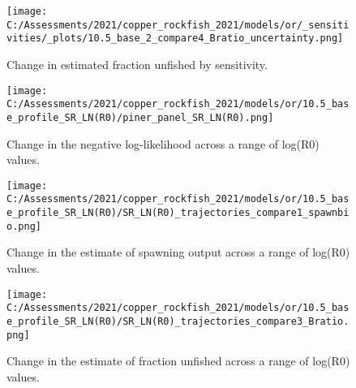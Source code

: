 \documentclass[11pt,
  english,
  a4paper,
]{article}
\begin{document}

\begin{figure}
\centering
\texttt{[image: C:/Assessments/2021/copper\_rockfish\_2021/models/or/\_sensitivities/\_plots/10.5\_base\_2\_compare4\_Bratio\_uncertainty.png]}
\caption{Change in estimated fraction unfished by sensitivity.\label{fig:sens-depl-2}}
\end{figure}

\tagmcend\tagstructend


\begin{figure}
\centering
\texttt{[image: C:/Assessments/2021/copper\_rockfish\_2021/models/or/10.5\_base\_profile\_SR\_LN(R0)/piner\_panel\_SR\_LN(R0).png]}
\caption{Change in the negative log-likelihood across a range of log(R0) values.\label{fig:r0-profile}}
\end{figure}

\tagmcend\tagstructend


\begin{figure}
\centering
\texttt{[image: C:/Assessments/2021/copper\_rockfish\_2021/models/or/10.5\_base\_profile\_SR\_LN(R0)/SR\_LN(R0)\_trajectories\_compare1\_spawnbio.png]}
\caption{Change in the estimate of spawning output across a range of log(R0) values.\label{fig:r0-ssb}}
\end{figure}

\tagmcend\tagstructend


\begin{figure}
\centering
\texttt{[image: C:/Assessments/2021/copper\_rockfish\_2021/models/or/10.5\_base\_profile\_SR\_LN(R0)/SR\_LN(R0)\_trajectories\_compare3\_Bratio.png]}
\caption{Change in the estimate of fraction unfished across a range of log(R0) values.\label{fig:r0-depl}}
\end{figure}
\end{document}
